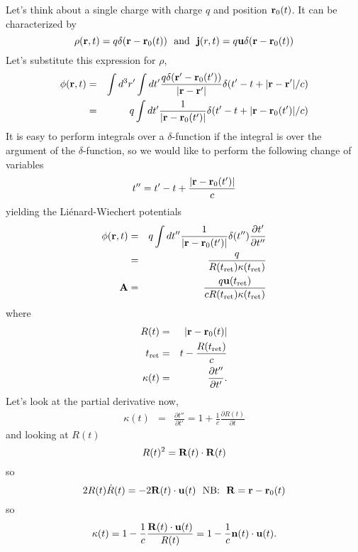 Let's think about a single charge with charge $q$ and position 
${\bf  r}_0(t)$.   It can be characterized by
\begin{equation}
\rho({\bf r},t) = q \delta({\bf r} -{\bf r}_0(t))~~\hbox{\rm
  and}~~{\bf j}(r, t) = q {\bf u} \delta({\bf r} - {\bf r}_0(t))
\label{eq:187}
\end{equation}
Let's substitute this expression for $\rho$,
\begin{eqnarray}
\phi({\bf r},t) &=& 
\int d^3 r' \int dt' \frac{q \delta({\bf r}'-{\bf r}_0(t'))}{|{\bf r} -
{\bf  r}'|} \delta ( t' - t + |{\bf r}-{\bf r}'|/c )  \\
 &=& 
q \int dt' \frac{1}{|{\bf r} -
{\bf  r}_0(t')|} \delta ( t' - t + |{\bf r}-{\bf r}_0(t')|/c )  
\label{eq:188}
\end{eqnarray}
It is easy to perform integrals over a $\delta$-function if the
integral is over the argument of the $\delta$-function, so we 
would like to perform the following change of variables
\begin{equation}
t'' = t' - t +  \frac{|{\bf r}-{\bf r}_0(t')|}{c}
\label{eq:189}
\end{equation}
yielding the Li\'enard-Wiechert potentials
\begin{eqnarray}
\phi({\bf r},t) &=& 
q \int dt'' \frac{1}{|{\bf r} -
{\bf  r}_0(t')|} \delta ( t'' ) \frac{\partial t'}{\partial t''} \\
&=& \frac{q}{R(t_{\hbox{\rm \scriptsize ret}}) \kappa (t_{\hbox{\rm \scriptsize ret}})}\\
{\bf A} &=& \frac{q{\bf u}(t_{\hbox{\rm \scriptsize ret}})}{cR(t_{\hbox{\rm \scriptsize ret}}) \kappa (t_{\hbox{\rm \scriptsize ret}})}
\label{eq:190}
\end{eqnarray}
where
\begin{eqnarray}
R(t) &=& |{\bf r} - {\bf r}_0(t)| \\
t_{\hbox{\rm \scriptsize ret}} &=& t - \frac{R(t_{\hbox{\rm \scriptsize ret}})}{c} \\
\kappa(t) &=&  \frac{\partial t''}{\partial t'}.
\label{eq:191}
\end{eqnarray}
Let's look at the partial derivative now,
\begin{eqnarray}
\kappa(t) &=&  \frac{\partial t''}{\partial t'} = 1 + \frac{1}{c}
\frac{\partial R(t)}{\partial t}
\label{eq:192}
\end{eqnarray}
and looking at $R(t)$
\begin{equation}
R(t)^2 = {\bf R}(t) \cdot {\bf R}(t) 
\label{eq:193}
\end{equation}
so
\begin{equation}
2 R(t) {\dot R}(t) = -2 {\bf R}(t) \cdot {\bf u}(t) ~~\hbox{\rm NB:} ~~{\bf R} = {\bf r}-{\bf r}_0(t)
\label{eq:194}
\end{equation}
so
\begin{equation}
\kappa(t) = 1 - \frac{1}{c} \frac{{\bf R}(t) \cdot {\bf u}(t)}{R(t)} = 1 - \frac{1}{c} {\bf n}(t) \cdot {\bf u}(t).
\label{eq:195}
\end{equation}

